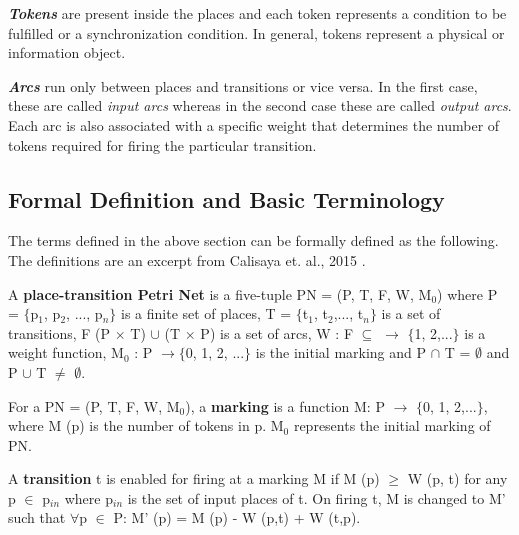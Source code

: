 \textbf{\textit{Tokens}} are present inside the places and each token represents a condition to be fulfilled or a synchronization condition. In general, tokens represent a physical or information object.

\textbf{\textit{Arcs}} run only between places and transitions or vice versa. In the first case, these are called \textit{input arcs} whereas in the second case these are called \textit{output arcs}. Each arc is also associated with a specific weight that determines the number of tokens required for firing the particular transition.

\subsection{Formal Definition and Basic Terminology}
The terms defined in the above section can be formally defined as the following. The definitions are an excerpt from Calisaya et. al., 2015 \cite{calisaya2016analysis}.

\begin{definition}
\label{def:def1}
A \textbf{place-transition Petri Net} \cite{reisig2012petri}  is a five-tuple PN = (P, T, F, W, M$_{0}$) where P = $ \lbrace $p$_{1}$, p$_{2}$, ..., p$_{n} \rbrace $ is a finite set of places, T = $ \lbrace $t$_{1}$, t$_{2}$,..., t$_{n} \rbrace $ is a set of transitions, F   (P $\times$ T) $ \cup $ (T $\times$ P) is a set of arcs, W : F $ \subseteq $ $ \rightarrow$ $ \lbrace $1, 2,...$ \rbrace $ is a weight function, M$_{0}$ : P  $ \rightarrow\lbrace $0, 1, 2, ...$ \rbrace $ is the initial marking and P $ \cap $ T = $\emptyset $ and P $ \cup $ T 
$ \neq $ $ \emptyset $.
\end{definition}

\begin{definition}
\label{def:def2}
For a PN = (P, T, F, W, M$_{0}$), a \textbf{marking} is a function M: P $  \rightarrow$ $ \lbrace $0, 1, 2,...$ \rbrace $, where M (p) is the number of tokens in p. M$_{0}$ represents the initial marking of PN.
\end{definition}


\begin{definition}
\label{def:def3}
A \textbf{transition} t is enabled for firing at a marking M if M (p) $ \geq $ W (p, t) for any p $ \in $ p$ _{in} $ where p$ _{in} $ is the set of input places of t. On firing t, M is changed to M' such that $ \forall $p $ \in $ P: M' (p) = M (p) - W (p,t) + W (t,p). 
\end{definition}

